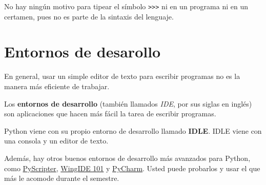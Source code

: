 No hay ningún motivo para tipear el símbolo \lstinline!>>>! ni en un
programa ni en un certamen, pues no es parte de la sintaxis del
lenguaje.

\section{Entornos de desarollo}

En general, usar un simple editor de texto para escribir programas no es
la manera más eficiente de trabajar.

Los \textbf{entornos de desarrollo} (también llamados \emph{IDE}, por
sus siglas en inglés) son aplicaciones que hacen más fácil la tarea de
escribir programas.

Python viene con su propio entorno de desarrollo llamado \textbf{IDLE}.
IDLE viene con una consola y un editor de texto.

Además, hay otros buenos entornos de desarrollo más avanzados para
Python, como
\href{http://code.google.com/p/pyscripter/downloads/list}{PyScripter},
\href{http://www.wingware.com/downloads/wingide-101/3.2.12-1/binaries}{WingIDE 101} y
\href{http://www.jetbrains.com/pycharm/}{PyCharm}.
Usted puede probarlos y usar el que más le acomode durante el
semestre.

